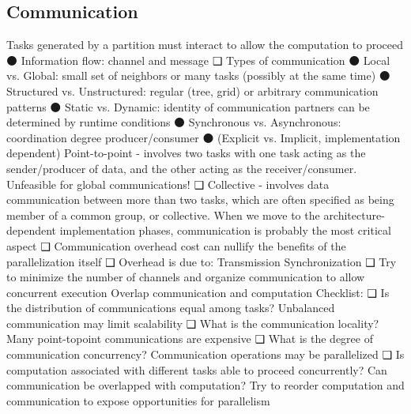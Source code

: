 \subsection{Communication}
Tasks generated by a partition must interact to allow
the computation to proceed
⚫ Information flow: channel and message
❑ Types of communication
⚫ Local vs. Global: small set of neighbors or many
tasks (possibly at the same time)
⚫ Structured vs. Unstructured: regular (tree, grid) or
arbitrary communication patterns
⚫ Static vs. Dynamic: identity of communication
partners can be determined by runtime conditions
⚫ Synchronous vs. Asynchronous: coordination
degree producer/consumer
⚫ (Explicit vs. Implicit, implementation dependent)
Point-to-point - involves two tasks with one task
acting as the sender/producer of data, and the
other acting as the receiver/consumer. Unfeasible
for global communications!
❑ Collective - involves
data communication
between more than two
tasks, which are often
specified as being
member of a common
group, or collective. 
When we move to the architecture-dependent
implementation phases, communication is
probably the most critical aspect
❑ Communication overhead cost can nullify the
benefits of the parallelization itself
❑ Overhead is due to:
Transmission
Synchronization
❑ Try to minimize the number of channels and
organize communication to allow concurrent
execution
Overlap communication and computation
Checklist:
❑ Is the distribution of communications equal
among tasks? Unbalanced communication may limit scalability
❑ What is the communication locality? Many point-topoint communications are expensive
❑ What is the degree of communication
concurrency? Communication operations may be parallelized
❑ Is computation associated with different tasks
able to proceed concurrently? Can communication
be overlapped with computation? Try to reorder
computation and communication to expose opportunities for
parallelism

